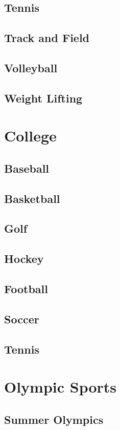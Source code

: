 		\subsection{Tennis}
		\subsection{Track and Field}
		\subsection{Volleyball}
		\subsection{Weight Lifting}
		\newpage
	\section{College}
		\subsection{Baseball}
		\subsection{Basketball}
		\subsection{Golf}
		\subsection{Hockey}
		\subsection{Football}
		\subsection{Soccer}
		\subsection{Tennis}
	\newpage
	\section{Olympic Sports}
	
		\subsection{Summer Olympics}

